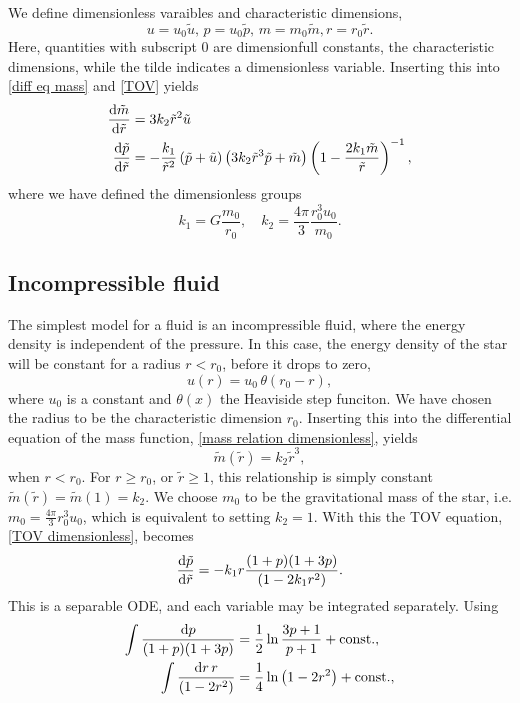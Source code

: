 We define dimensionless varaibles and characteristic dimensions,
%
\begin{equation}
    u = u_0 \tilde u, \, p = u_0 \tilde p, \, m =  m_0 \tilde m, r = r_0 \tilde r.
\end{equation}
%
Here, quantities with subscript $0$ are dimensionfull constants, the characteristic dimensions, while the tilde indicates a dimensionless variable.
Inserting this into \autoref{diff eq mass} and \autoref{TOV} yields
%
\begin{align}
    \label{mass relation dimensionless}
    \diff{ \tilde m}{\tilde r} & = 3 k_2 \tilde r^2 \tilde u \\
    \label{TOV dimensionless}
    \diff{\tilde p}{\tilde r} & 
    = - \frac{k_1}{\tilde r^2} \left(\tilde p + \tilde u\right) \left(3 k_2 \tilde r^3 \tilde p + \tilde m\right) 
    \left(1 - \frac{2 k_1  \tilde m}{\tilde r}\right)^{-1},
\end{align}
%
where we have defined the dimensionless groups
%
\begin{equation}
    \label{dimensionless groups}
    k_1 = G \frac{m_0}{r_0}, \quad k_2 =  \frac{4 \pi}{3} \frac{r_0^3 u_0}{m_0}.
\end{equation}
%


\subsection*{Incompressible fluid}

The simplest model for a fluid is an incompressible fluid, where the energy density is independent of the pressure.
In this case, the energy density of the star will be constant for a radius $r < r_0$, before it drops to zero,
%
\begin{equation}
    u(r) = u_0 \, \theta (r_0 - r),
\end{equation}
%
where $u_0$ is a constant and $\theta(x)$ the Heaviside step funciton.
We have chosen the radius to be the characteristic dimension $r_0$.
Inserting this into the differential equation of the mass function, \autoref{mass relation dimensionless}, yields
%
\begin{equation}
    \tilde m(\tilde r) = k_2 \tilde r^3,
\end{equation}
%
when $r < r_0$.
For $r \geq r_0$, or $\tilde r \geq 1$, this relationship is simply constant $\tilde m(\tilde r) = \tilde m(1) = k_2$.
We choose $m_0$ to be the gravitational mass of the star, i.e. $m_0 = \frac{4 \pi }{3} r_0^3 u_0$, which is equivalent to setting $k_2 = 1$.
With this the TOV equation, \autoref{TOV dimensionless}, becomes
%
\begin{equation} 
    \diff{\tilde p}{\tilde r} = - k_1 r \frac{(1 + p)(1 + 3 p)}{(1 - 2 k_1 r^2)}.
\end{equation}
%
This is a separable ODE, and each variable may be integrated separately.
Using
%
\begin{align}
    \int \frac{\text{d} p}{(1 + p)(1 + 3p)} 
    & = \frac{1}{2} \ln \frac{3p + 1}{p + 1} + \mathrm{const.} , \\
    \int \frac{\text{d} r \, r}{(1 - 2 r^2)} 
    & = \frac{1}{4}\ln\left(1 - 2 r^2 \right)
    + \mathrm{const.},
\end{align}
%

